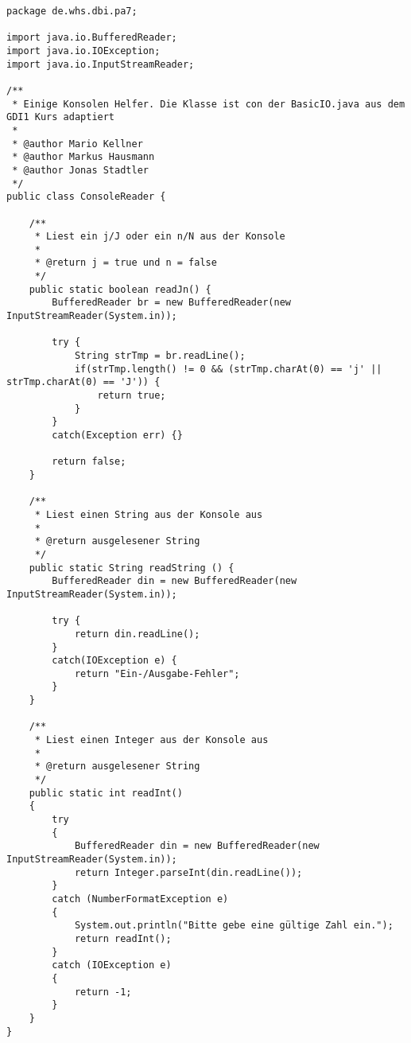 \begin{lstlisting}[caption={ConsoleReader (optimiert)}, label={lst:crv2}]
package de.whs.dbi.pa7;

import java.io.BufferedReader;
import java.io.IOException;
import java.io.InputStreamReader;

/**
 * Einige Konsolen Helfer. Die Klasse ist con der BasicIO.java aus dem GDI1 Kurs adaptiert
 * 
 * @author Mario Kellner
 * @author Markus Hausmann
 * @author Jonas Stadtler
 */
public class ConsoleReader {
	
	/**
	 * Liest ein j/J oder ein n/N aus der Konsole
	 * 
	 * @return j = true und n = false
	 */
	public static boolean readJn() {
		BufferedReader br = new BufferedReader(new InputStreamReader(System.in));
		
		try {
			String strTmp = br.readLine();
			if(strTmp.length() != 0 && (strTmp.charAt(0) == 'j' || strTmp.charAt(0) == 'J')) {
				return true;
			}
		}
		catch(Exception err) {}
		
		return false;
	}
	
	/**
	 * Liest einen String aus der Konsole aus
	 * 
	 * @return ausgelesener String
	 */
	public static String readString () {
		BufferedReader din = new BufferedReader(new InputStreamReader(System.in)); 
		
		try {	
			return din.readLine();
		}
		catch(IOException e) {				  
			return "Ein-/Ausgabe-Fehler";
		}
	}
	
	/**
	 * Liest einen Integer aus der Konsole aus
	 * 
	 * @return ausgelesener String
	 */
	public static int readInt()
	{
		try 
		{
			BufferedReader din = new BufferedReader(new InputStreamReader(System.in));
			return Integer.parseInt(din.readLine());
		}
		catch (NumberFormatException e)
		{
			System.out.println("Bitte gebe eine gültige Zahl ein.");
			return readInt();
		}
		catch (IOException e)
		{
			return -1;
		}
	}
}
\end{lstlisting}

